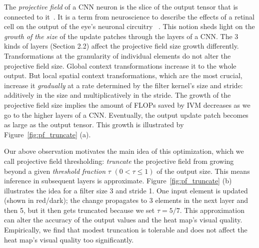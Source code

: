 The \textit{projective field} of a CNN neuron is the slice of the output tensor that is connected to it~\cite{basiccnnoperations}. It is a term from neuroscience to describe the effects of a retinal cell on the output of the eye's neuronal circuitry~ \cite{de2011projective}. This notion sheds light on the \textit{growth of the size} of the update patches through the layers of a CNN. The 3 kinds of layers (Section 2.2) affect the projective field size growth differently. Transformations at the granularity of individual elements do not alter the projective field size. Global context transformations increase it to the whole output. But local spatial context transformations, which are the most crucial, increase it \textit{gradually} at a rate determined by the filter kernel's size and stride: additively in the size and multiplicatively in the stride. The growth of the projective field size implies the amount of FLOPs saved by IVM decreases as we go to the higher layers of a CNN. Eventually, the output update patch becomes as large as the output tensor. This growth is illustrated by Figure~\ref{fig:pf_truncate} (a).


Our above observation motivates the main idea of this optimization, which we call projective field thresholding: \textit{truncate} the projective field from growing beyond a given \textit{threshold fraction} $\tau$ $(0 < \tau \leq 1)$ of the output size. This means inference in subsequent layers is approximate. Figure~\ref{fig:pf_truncate} (b) illustrates the idea for a filter size 3 and stride 1. One input element is updated (shown in red/dark); the change propagates to 3 elements in the next layer and then 5, but it then gets truncated because we set $\tau = 5/7$. This approximation can alter the accuracy of the output values and the heat map's visual quality. Empirically, we find that modest truncation is tolerable and does not affect the heat map's visual quality too significantly. 

